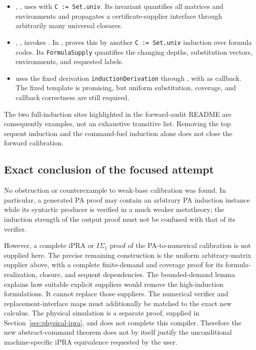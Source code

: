 \begin{itemize}
\item {},
, uses
 with
\texttt{C := Set.univ}. Its invariant quantifies all matrices and
environments and propagates a certificate-supplier interface through
arbitrarily many universal closures.
\item {},
, invokes
.
In ,
 proves this by another
\texttt{C := Set.univ} induction over formula codes. Its
\texttt{FormulaSupply} quantifies the changing depths, substitution
vectors, environments, and requested labels.
\item {}
uses the fixed derivation \texttt{inductionDerivation} through
, with
 as callback. The fixed template
is promising, but uniform substitution, coverage, and callback
correctness are still required.
\end{itemize}

The two full-induction sites highlighted in the forward-audit README
are consequently examples, not an exhaustive transitive list.
Removing the top sequent induction and the command-fuel induction
alone does not close the forward calibration.

\subsection{Exact conclusion of the focused attempt}

No obstruction or counterexample to weak-base calibration was found.
In particular, a generated PA proof may contain an arbitrary PA
induction instance while its syntactic producer is verified in a much
weaker metatheory; the induction strength of the output proof must not
be confused with that of its verifier.

However, a complete iPRA or $I\Sigma_1$ proof of the PA-to-numerical
calibration is not supplied here. The precise remaining construction
is the uniform arbitrary-matrix supplier above, with a complete
finite-demand and coverage proof for its formula-realization,
closure, and sequent dependencies. The bounded-demand lemma explains
how suitable explicit suppliers would remove the high-induction
formulations. It cannot replace those suppliers. The numerical
verifier and replacement-interface maps must additionally be matched
to the exact new calculus. The physical simulation is a separate
proof, supplied in Section~\ref{sec:physical-ipra}, and does not
complete this compiler. Therefore the new abstract-command theorem does
not by itself justify the unconditional machine-specific iPRA
equivalence requested by the user.
